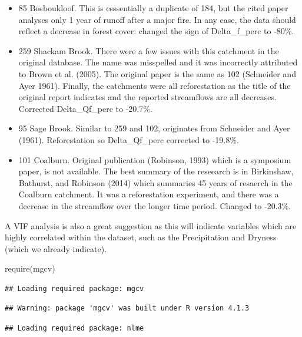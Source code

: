 \documentclass[]{elsarticle} %
\newenvironment{Shaded}{\begin{snugshade}}{\end{snugshade}}
\newcommand{\FunctionTok}[1]{\textcolor[rgb]{0.00,0.00,0.00}{#1}}
\newcommand{\NormalTok}[1]{#1}
\begin{document}
\begin{itemize}
\item
  85 Bosboukloof. This is esssentially a duplicate of 184, but the cited paper analyses only 1 year of runoff after a major fire. In any case, the data should reflect a decrease in forest cover: changed the sign of Delta\_f\_perc to -80\%.\\
\item
  259 Shackam Brook. There were a few issues with this catchment in the original database. The name was misspelled and it was incorrectly attributed to Brown et al. (2005). The original paper is the same as 102 (Schneider and Ayer 1961). Finally, the catchments were all reforestation as the title of the original report indicates and the reported streamflows are all decreases. Corrected Delta\_Qf\_perc to -20.7\%.\\
\item
  95 Sage Brook. Similar to 259 and 102, originates from Schneider and Ayer (1961). Reforestation so Delta\_Qf\_perc corrected to -19.8\%.\\
\item
  101 Coalburn. Original publication (Robinson, 1993) which is a symposium paper, is not available. The best summary of the reseearch is in Birkinshaw, Bathurst, and Robinson (2014) which summaries 45 years of resaerch in the Coalburn catchment. It was a reforestation experiment, and there was a decrease in the streamflow over the longer time period. Changed to -20.3\%.
\end{itemize}

A VIF analysis is also a great suggestion as this will indicate variables which are highly correlated within the dataset, such as the Precipitation and Dryness (which we already indicate).

\begin{Shaded}
\begin{Highlighting}[]
\FunctionTok{require}\NormalTok{(mgcv)}
\end{Highlighting}
\end{Shaded}

\begin{verbatim}
## Loading required package: mgcv
\end{verbatim}

\begin{verbatim}
## Warning: package 'mgcv' was built under R version 4.1.3
\end{verbatim}

\begin{verbatim}
## Loading required package: nlme
\end{verbatim}
\end{document}
